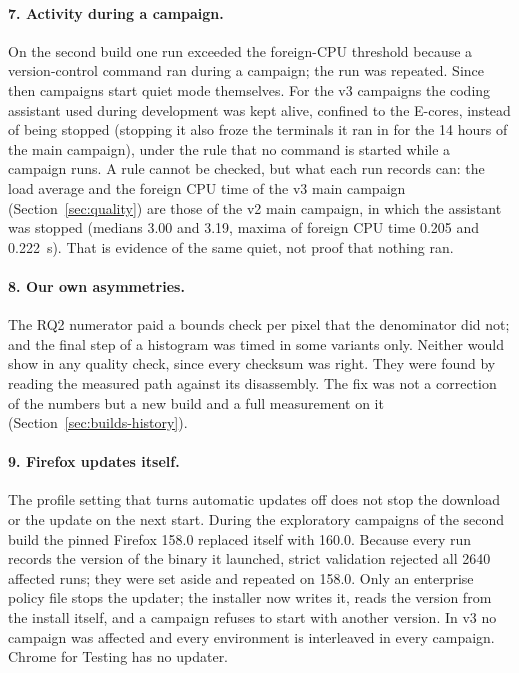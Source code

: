 \paragraph{7. Activity during a campaign.} On the second build one run
exceeded the foreign-CPU threshold because a version-control command ran
during a campaign; the run was repeated. Since then campaigns start quiet
mode themselves. For the v3 campaigns the coding assistant used during
development was kept alive, confined to the E-cores, instead of being
stopped (stopping it also froze the terminals it ran in for the 14 hours of
the main campaign), under the rule that no command is started while a
campaign runs. A rule cannot be checked, but what each run records can: the
load average and the foreign CPU time of the v3 main campaign
(Section~\ref{sec:quality}) are those of the v2 main campaign, in which the
assistant was stopped (medians 3.00 and 3.19, maxima of foreign CPU time
0.205 and 0.222~s). That is evidence of the same quiet, not proof that
nothing ran.

\paragraph{8. Our own asymmetries.} The RQ2 numerator paid a bounds check
per pixel that the denominator did not; and the final step of a histogram
was timed in some variants only. Neither would show in any quality check,
since every checksum was right. They were found by reading the measured
path against its disassembly. The fix was not a correction of the numbers
but a new build and a full measurement on it
(Section~\ref{sec:builds-history}).

\paragraph{9. Firefox updates itself.} The profile setting that turns
automatic updates off does not stop the download or the update on the next
start. During the exploratory campaigns of the second build the pinned
Firefox 158.0 replaced itself with 160.0. Because every run records the
version of the binary it launched, strict validation rejected all 2640
affected runs; they were set aside and repeated on 158.0. Only an
enterprise policy file stops the updater; the installer now writes it, reads
the version from the install itself, and a campaign refuses to start with
another version. In v3 no campaign was affected and every environment is
interleaved in every campaign. Chrome for Testing has no updater.

